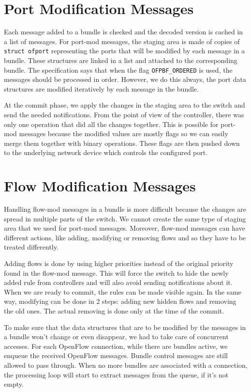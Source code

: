 \section{Port Modification Messages}

Each message added to a bundle is checked and the decoded version is cached in a list of messages.
For port-mod messages, the staging area is made of copies of \texttt{struct ofport} representing the ports that
will be modified by each message in a bundle. These structures are linked in a list and attached to the corresponding bundle.
The specification says that when the flag \texttt{OFPBF_ORDERED} is used, the messages should be processed in order.
However, we do this always, the port data structures are modified iteratively by each message in the bundle.

At the commit phase, we apply the changes in the
staging area to the switch and send the needed notifications. From the point of view of the controller, there was only
one operation that did all the changes together. This is possible for port-mod messages because the modified values are mostly
flags so we can easily merge them together with binary operations. These flags are then pushed down to the underlying
network device which controls the configured port.

\section{Flow Modification Messages}

Handling flow-mod messages in a bundle is more difficult because the changes are spread in multiple parts of the switch.
We cannot create the same type of staging area that we used for port-mod messages. Moreover, flow-mod messages can have
different actions, like adding, modifying or removing flows and so they have to be treated differently.

Adding flows is done by using higher priorities instead of the original priority found in the flow-mod message. This
will force the switch to hide the newly added rule from controllers and will also avoid sending notifications about it.
When we are ready to commit, the rules can be made visible again. In the same way, modifying can be done in 2 steps:
adding new hidden flows and removing the old ones. The actual removing is done only at the time of the commit.

To make sure that the data structures that are to be modified by the messages in a bundle won't change or even disappear,
we had to take care of concurrent accesses. For each OpenFlow connection, while there are bundles active, we enqueue the
received OpenFlow messages. Bundle control messages are still allowed to pass through. When no more bundles are associated
with a connection, the processing loop will start to extract messages from the queue, if it's not empty.